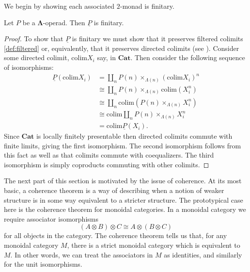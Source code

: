 \documentclass{amsbook} %
\newcommand{\ML}{\mathbf{\Lambda}}
\numberwithin{section}{chapter}
\begin{document}
We begin by showing each associated $2$-monad is finitary.
\begin{prop}
Let $P$ be a $\ML$-operad. Then $\underline{P}$ is finitary.
\end{prop}
\begin{proof}
To show that $\underline{P}$ is finitary we must show that it preserves filtered colimits \ref{def:filtered} or, equivalently, that it preserves directed colimits (see \cite{ar}). Consider some directed colimit, $\text{colim}X_{i}$ say, in $\mathbf{Cat}$. Then consider the following sequence of isomorphisms:
    \begin{align*}
        \underline{P}(\text{colim}X_{i}) &= \coprod_n P(n) \times_{\Lambda(n)} (\text{colim}X_{i})^n \\
                                                               &\cong \coprod_n P(n) \times_{\Lambda(n)} \text{colim}(X_{i}^n) \\
                                                               &\cong \coprod_n \text{colim}(P(n) \times_{\Lambda(n)} X_{i}^n) \\
                                                               &\cong \text{colim}\coprod_n P(n) \times_{\Lambda(n)} X_{i}^n \\
                                                               &= \text{colim}\underline{P}(X_{i}).
    \end{align*}
Since $\mathbf{Cat}$ is locally finitely presentable then directed colimits commute with finite limits, giving the first isomorphism. The second isomorphism follows from this fact as well as that colimits commute with coequalizers. The third isomorphism is simply coproducts commuting with other colimits.
\end{proof}

The next part of this section is motivated by the issue of coherence. At its most basic, a coherence theorem is a way of describing when a notion of weaker structure is in some way equivalent to a stricter structure. The prototypical case here is the coherence theorem for monoidal categories. In a monoidal category we require associator isomorphisms
    \[
        \left( A \otimes B \right) \otimes C \cong A \otimes \left( B \otimes C \right)
    \]
for all objects in the category. The coherence theorem tells us that, for any monoidal category $M$, there is a strict monoidal category which is equivalent to $M$.  In other words, we can treat the associators in $M$ as identities, and similarly for the unit isomorphisms.
\end{document}
